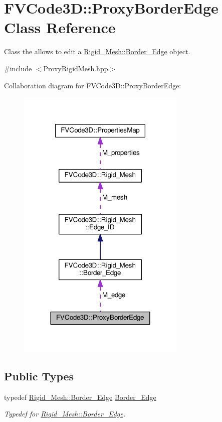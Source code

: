 \hypertarget{classFVCode3D_1_1ProxyBorderEdge}{}\section{F\+V\+Code3D\+:\+:Proxy\+Border\+Edge Class Reference}
\label{classFVCode3D_1_1ProxyBorderEdge}


Class the allows to edit a \hyperlink{classFVCode3D_1_1Rigid__Mesh_1_1Border__Edge}{Rigid\+\_\+\+Mesh\+::\+Border\+\_\+\+Edge} object.  




{\ttfamily \#include $<$Proxy\+Rigid\+Mesh.\+hpp$>$}



Collaboration diagram for F\+V\+Code3D\+:\+:Proxy\+Border\+Edge\+:
\nopagebreak
\begin{figure}[H]
\begin{center}
\leavevmode
\includegraphics[width=228pt]{classFVCode3D_1_1ProxyBorderEdge__coll__graph}
\end{center}
\end{figure}
\subsection*{Public Types}
\begin{DoxyCompactItemize}
\item 
typedef \hyperlink{classFVCode3D_1_1Rigid__Mesh_1_1Border__Edge}{Rigid\+\_\+\+Mesh\+::\+Border\+\_\+\+Edge} \hyperlink{classFVCode3D_1_1ProxyBorderEdge_a176560e18e23c914702256b4921d9c9c}{Border\+\_\+\+Edge}
\begin{DoxyCompactList}\small\item\em Typedef for \hyperlink{classFVCode3D_1_1Rigid__Mesh_1_1Border__Edge}{Rigid\+\_\+\+Mesh\+::\+Border\+\_\+\+Edge}. \end{DoxyCompactList}\end{DoxyCompactItemize}

